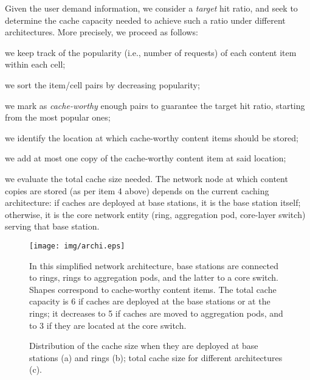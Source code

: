 \documentclass{sig-alternate-05-2015}
\let\tempthree\enumerate
\let\tempfour\endenumerate
\renewenvironment{enumerate}{\tempthree\addtolength{\itemsep}{-0.7\baselineskip}}{\tempfour}
\begin{document}
Given the user demand information, we consider a {\em target} hit ratio, and seek to determine the cache capacity needed to achieve such a ratio under different architectures.
More precisely, we proceed as follows:
\begin{enumerate}
\item we keep track of the popularity (i.e., number of requests) of each content item within each cell;
\item we sort the item/cell pairs by decreasing popularity;
\item we mark as {\em cache-worthy} enough pairs to guarantee the target hit ratio, starting from the most popular ones;
\item we identify the location at which cache-worthy content items should be stored;
\item we add at most one copy of the cache-worthy content item at said location;
\item we evaluate the total cache size needed.
\end{enumerate}
The network node at which content copies are stored (as per item 4 above) depends on the current caching architecture: if caches are deployed at base stations, it is the base station itself; otherwise, it is the core network entity (ring, aggregation pod, core-layer switch) serving that base station.

\begin{figure}[]
\centering
\texttt{[image: img/archi.eps]}
\caption{In this simplified network architecture, base stations are
  connected to rings, rings to aggregation pods, and the latter to a
  core switch. Shapes correspond to cache-worthy content items. The
  total cache capacity is 6 if caches are deployed at the base
  stations or at the rings; it decreases to 5 if caches are moved to
  aggregation pods, 
and to 3 if they are located at the core switch.\label{fig:archi}
\vspace{-3mm}} \end{figure}

\begin{figure*}[]
\centering
{}   \caption{Distribution of the cache size when they are deployed at base stations (a) and rings (b); total cache size for different architectures (c).
\vspace*{-3mm}
} \end{figure*}
\end{document}
